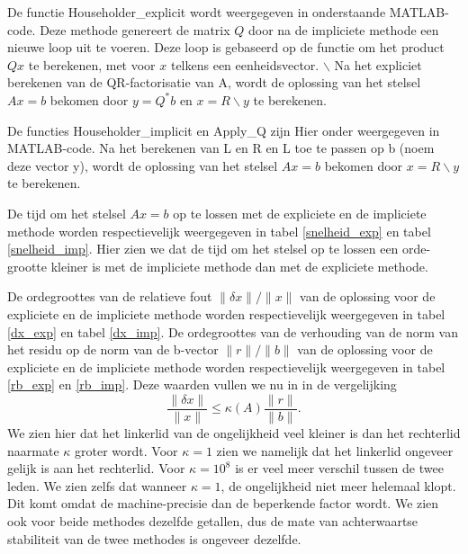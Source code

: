 De functie Householder\_explicit wordt weergegeven in onderstaande MATLAB-code. Deze methode genereert de matrix $Q$ door na de impliciete methode een nieuwe loop uit te voeren. Deze loop is gebaseerd op de functie om het product $Qx$ te berekenen, met voor $x$ telkens een eenheidsvector.
$\backslash$
Na het expliciet berekenen van de QR-factorisatie van A, wordt de oplossing van het stelsel $Ax=b$ bekomen door $y = Q^*b$ en $x= R\backslash y$ te berekenen.



De functies Householder\_implicit en Apply\_Q zijn Hier onder weergegeven in MATLAB-code.
Na het berekenen van L en R en L toe te passen op b (noem deze vector y), wordt de oplossing van het stelsel $Ax=b$ bekomen door $x= R\backslash y$ te berekenen. 





De tijd om het stelsel $Ax=b$ op te lossen met de expliciete en de impliciete methode worden respectievelijk weergegeven in tabel \ref{snelheid_exp} en tabel \ref{snelheid_imp}. Hier zien we dat de tijd om het stelsel op te lossen een orde-grootte kleiner is met de impliciete methode dan met de expliciete methode.

De ordegroottes van de relatieve fout $\lVert \delta x \rVert/\lVert x \rVert$ van de oplossing voor de expliciete en de impliciete methode worden respectievelijk weergegeven in tabel \ref{dx_exp} en tabel \ref{dx_imp}.
De ordegroottes van de verhouding van de norm van het residu op de norm van de b-vector $\lVert r \rVert/\lVert b \rVert$ van de oplossing voor de expliciete en de impliciete methode worden respectievelijk weergegeven in tabel \ref{rb_exp} en \ref{rb_imp}. Deze waarden vullen we nu in in de vergelijking
$$ \frac{\lVert \delta x \rVert}{\lVert x \rVert} \leq \kappa(A) \frac{\lVert r \rVert}{\lVert b \rVert}.$$
We zien hier dat het linkerlid van de ongelijkheid veel kleiner is dan het rechterlid naarmate $\kappa$ groter wordt. Voor $\kappa = 1$ zien we namelijk dat het linkerlid ongeveer gelijk is aan het rechterlid. Voor $\kappa = 10^8$ is er veel meer verschil tussen de twee leden. We zien zelfs dat wanneer $\kappa = 1$, de ongelijkheid niet meer helemaal klopt. Dit komt omdat de machine-precisie dan de beperkende factor wordt. We zien ook voor beide methodes dezelfde getallen, dus de mate van achterwaartse stabiliteit van de twee methodes is ongeveer dezelfde.

